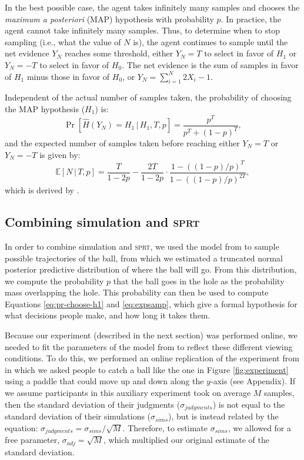 \documentclass[10pt,letterpaper]{article}
\begin{document}
In the best possible case, the agent takes infinitely many samples and chooses the \emph{maximum a posteriori} (MAP) hypothesis with probability $p$. 
In practice, the agent cannot take infinitely many samples. 
Thus, to determine when to stop sampling (i.e., what the value of $N$ is), the agent continues to sample until the net evidence $Y_N$ reaches some threshold, either $Y_N=T$ to select in favor of $H_1$ or $Y_N=-T$ to select in favor of $H_0$. 
The net evidence is the sum of samples in favor of $H_1$ minus those in favor of $H_0$, or $Y_N=\sum_{i=1}^N 2X_i-1$.

Independent of the actual number of samples taken, the probability of choosing the MAP hypothesis ($H_1$) is:
\begin{equation}
\Pr[\hat{H}(Y_N)=H_1\,|\,H_1,T,p]=\frac{p^T}{p^T+(1-p)^T},
\label{eq:pr-choose-h1}
\end{equation}
and the expected number of samples taken before reaching either $Y_N=T$ or $Y_N=-T$ is given by:
\begin{equation}
\mathbb{E}[N\,|\,T,p]=\frac{T}{1-2p}-\frac{2T}{1-2p}\cdot{}\frac{1-((1-p)/p)^T}{1-((1-p)/p)^{2T}},
\label{eq:expsamp}
\end{equation}
which is derived by .

\subsection{Combining simulation and \textsc{sprt}}

In order to combine simulation and \textsc{sprt}, we used the model from  to sample possible trajectories of the ball, from which we estimated a truncated normal posterior predictive distribution of where the ball will go.
From this distribution, we compute the probability $p$ that the ball goes in the hole as the probability mass overlapping the hole.
This probability can then be used to compute Equations \ref{eq:pr-choose-h1} and \ref{eq:expsamp}, which give a formal hypothesis for what decisions people make, and how long it takes them.

Because our experiment (described in the next section) was performed online, we needed to fit the parameters of the model from  to reflect these different viewing conditions.
To do this, we performed an online replication of the experiment from  in which we asked people to catch a ball like the one in Figure \ref{fig:experiment} using a paddle that could move up and down along the $y$-axis (see Appendix).
If we assume participants in this auxiliary experiment took on average $M$ samples, then the standard deviation of their judgments ($\sigma_{judgments}$) is not equal to the standard deviation of their simulations ($\sigma_{sims}$), but is instead related by the equation: $\sigma_{judgments} = \sigma_{sims} / \sqrt{M}$.
Therefore, to estimate $\sigma_{sims}$, we allowed for a free parameter, $\sigma_{adj}=\sqrt{M}$, which multiplied our original estimate of the standard deviation.
\end{document}
